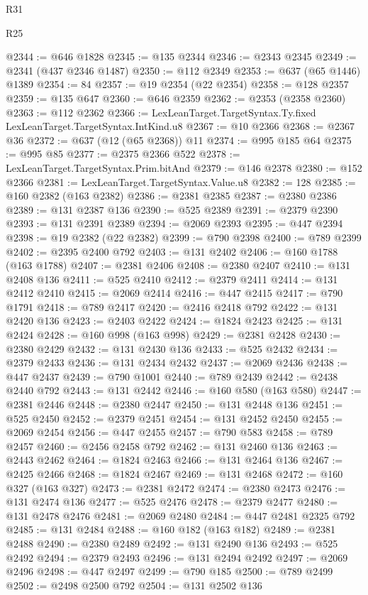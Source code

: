 \begin{lexlean}{R31}
\begin{lexlean}{R25}
\begin{coremodule}
{{{{{{{{{{{{{{{{{{{{{{{{{{{{{{{{{{{{{{{{{{{{{{{{{{{{{{{{{{{{{{{{{{{{{{{{{{{{{{{{{{{{{{{{{{{{{{{{{{{{{{{{{{{{{{{{{{{{{{{{{{{{{{{{{{{{{{{{{{{{{{{{{{{{{{{{{{{{{{{{{{{{{{{{{{{{{{{{{{{{{{{{{{{{{{{{{{{{{{{@2344 := @646 @1828
@2345 := @135 @2344
@2346 := @2343 @2345
@2349 := @2341 (@437 @2346 @1487)
@2350 := @112 @2349
@2353 := @637 (@65 @1446) @1389
@2354 := 84
@2357 := @19 @2354 (@22 @2354)
@2358 := @128 @2357
@2359 := @135 @647
@2360 := @646 @2359
@2362 := @2353 (@2358 @2360)
@2363 := @112 @2362
@2366 := LexLeanTarget.TargetSyntax.Ty.fixed LexLeanTarget.TargetSyntax.IntKind.u8
@2367 := @10 @2366
@2368 := @2367 @36
@2372 := @637 (@12 (@65 @2368)) @11
@2374 := @995 @185 @64
@2375 := @995 @85
@2377 := @2375 @2366 @522
@2378 := LexLeanTarget.TargetSyntax.Prim.bitAnd
@2379 := @146 @2378
@2380 := @152 @2366
@2381 := LexLeanTarget.TargetSyntax.Value.u8
@2382 := 128
@2385 := @160 @2382 (@163 @2382)
@2386 := @2381 @2385
@2387 := @2380 @2386
@2389 := @131 @2387 @136
@2390 := @525 @2389
@2391 := @2379 @2390
@2393 := @131 @2391 @2389
@2394 := @2069 @2393
@2395 := @447 @2394
@2398 := @19 @2382 (@22 @2382)
@2399 := @790 @2398
@2400 := @789 @2399
@2402 := @2395 @2400 @792
@2403 := @131 @2402
@2406 := @160 @1788 (@163 @1788)
@2407 := @2381 @2406
@2408 := @2380 @2407
@2410 := @131 @2408 @136
@2411 := @525 @2410
@2412 := @2379 @2411
@2414 := @131 @2412 @2410
@2415 := @2069 @2414
@2416 := @447 @2415
@2417 := @790 @1791
@2418 := @789 @2417
@2420 := @2416 @2418 @792
@2422 := @131 @2420 @136
@2423 := @2403 @2422
@2424 := @1824 @2423
@2425 := @131 @2424
@2428 := @160 @998 (@163 @998)
@2429 := @2381 @2428
@2430 := @2380 @2429
@2432 := @131 @2430 @136
@2433 := @525 @2432
@2434 := @2379 @2433
@2436 := @131 @2434 @2432
@2437 := @2069 @2436
@2438 := @447 @2437
@2439 := @790 @1001
@2440 := @789 @2439
@2442 := @2438 @2440 @792
@2443 := @131 @2442
@2446 := @160 @580 (@163 @580)
@2447 := @2381 @2446
@2448 := @2380 @2447
@2450 := @131 @2448 @136
@2451 := @525 @2450
@2452 := @2379 @2451
@2454 := @131 @2452 @2450
@2455 := @2069 @2454
@2456 := @447 @2455
@2457 := @790 @583
@2458 := @789 @2457
@2460 := @2456 @2458 @792
@2462 := @131 @2460 @136
@2463 := @2443 @2462
@2464 := @1824 @2463
@2466 := @131 @2464 @136
@2467 := @2425 @2466
@2468 := @1824 @2467
@2469 := @131 @2468
@2472 := @160 @327 (@163 @327)
@2473 := @2381 @2472
@2474 := @2380 @2473
@2476 := @131 @2474 @136
@2477 := @525 @2476
@2478 := @2379 @2477
@2480 := @131 @2478 @2476
@2481 := @2069 @2480
@2484 := @447 @2481 @2325 @792
@2485 := @131 @2484
@2488 := @160 @182 (@163 @182)
@2489 := @2381 @2488
@2490 := @2380 @2489
@2492 := @131 @2490 @136
@2493 := @525 @2492
@2494 := @2379 @2493
@2496 := @131 @2494 @2492
@2497 := @2069 @2496
@2498 := @447 @2497
@2499 := @790 @185
@2500 := @789 @2499
@2502 := @2498 @2500 @792
@2504 := @131 @2502 @136
}}}}}}}}}}}}}}}}}}}}}}}}}}}}}}}}}}}}}}}}}}}}}}}}}}}}}}}}}}}}}}}}}}}}}}}}}}}}}}}}}}}}}}}}}}}}}}}}}}}}}}}}}}}}}}}}}}}}}}}}}}}}}}}}}}}}}}}}}}}}}}}}}}}}}}}}}}}}}}}}}}}}}}}}}}}}}}}}}}}}}}}}}}}}}}}}}}}}}}}
\end{coremodule}
\end{lexlean}
\end{lexlean}
